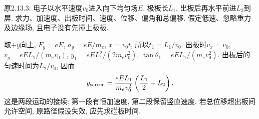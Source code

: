 \begin{example}\label{ex:electronplates}
原2.13.3: 电子以水平速度$v_0$进入向下均匀场$E$, 极板长$L_1$, 出板后再水平前进$L_2$到屏. 求力、加速度、出板时间、速度、位移、偏角和总偏移. 假定低速、忽略重力及边缘场, 且电子没有先撞上极板.
\end{example}
\begin{solution}
取$+y$向上, $F_y=eE$, $a_y=eE/m_e$, $x=v_0t$, 所以$t_1=L_1/v_0$.
出板时$v_x=v_0$, $v_y=eEL_1/(m_ev_0)$, $y_1=eEL_1^2/(2m_ev_0^2)$,
$\tan\theta_1=eEL_1/(m_ev_0^2)$. 出板后的匀速时间为$L_2/v_0$, 因而
\[
y_{\rm screen}=\frac{eEL_1}{m_ev_0^2}\left(\frac{L_1}{2}+L_2\right).
\]
这是两段运动的接续: 第一段有恒加速度, 第二段保留竖直速度. 若总位移超出板间允许空间, 原路径假设失效, 应先求碰板时间.
\end{solution}
